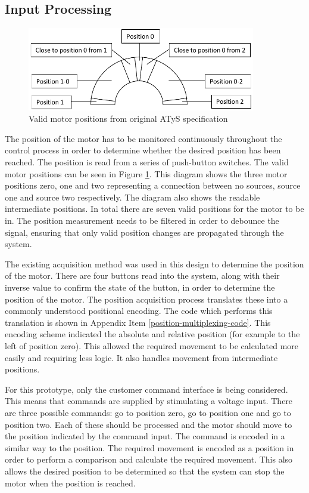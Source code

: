 \subsection{Input Processing}

\begin{figure}[h]
\centering
\includegraphics[width=0.89\textwidth]{images/Positions.pdf}
\caption{Valid motor positions from original ATyS specification}
\label{motor_positions}
\end{figure}

The position of the motor has to be monitored continuously throughout the control process in order to determine whether the desired position has been reached. The position is read from a series of push-button switches. The valid motor positions can be seen in Figure \ref{motor_positions}. This diagram shows the three motor positions zero, one and two representing a connection between no sources, source one and source two respectively. The diagram also shows the readable intermediate positions. In total there are seven valid positions for the motor to be in. The position measurement needs to be filtered in order to debounce the signal, ensuring that only valid position changes are propagated through the system.

The existing acquisition method was used in this design to determine the position of the motor. There are four buttons read into the system, along with their inverse value to confirm the state of the button, in order to determine the position of the motor. The position acquisition process translates these into a commonly understood positional encoding. The code which performs this translation is shown in Appendix Item \ref{position-multiplexing-code}. This encoding scheme indicated the absolute and relative position (for example to the left of position zero). This allowed the required movement to be calculated more easily and requiring less logic. It also handles movement from intermediate positions. 

For this prototype, only the customer command interface is being considered. This means that commands are supplied by stimulating a voltage input. There are three possible commands: go to position zero, go to position one and go to position two. Each of these should be processed and the motor should move to the position indicated by the command input.
The command is encoded in a similar way to the position. The required movement is encoded as a position in order to perform a comparison and calculate the required movement. This also allows the desired position to be determined so that the system can stop the motor when the position is reached. 

